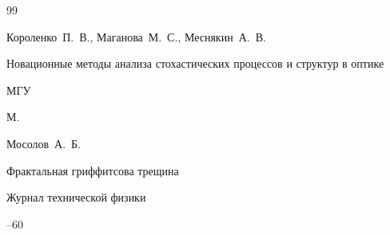 \begin{thebibliography}{99}















\by Короленко~П.~В., Маганова~М.~С., Меснякин~А.~В.

\book Новационные методы анализа стохастических процессов и структур в оптике 


\publ  МГУ

\publaddr М.


















\by Мосолов~А.~Б.

\paper Фрактальная гриффитсова трещина  

\jour Журнал технической физики




--60





\end{thebibliography}
